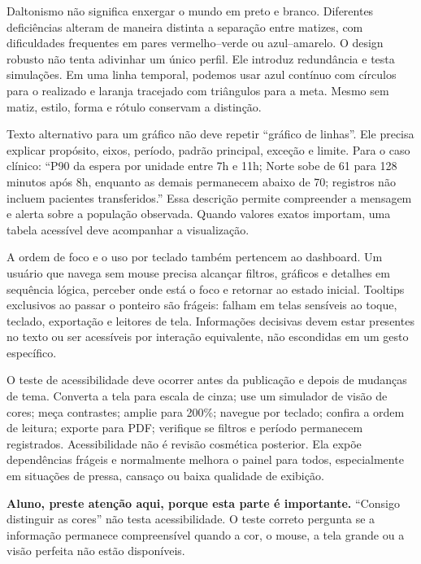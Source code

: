 Daltonismo não significa enxergar o mundo em preto e branco. Diferentes deficiências alteram de maneira distinta a separação entre matizes, com dificuldades frequentes em pares vermelho--verde ou azul--amarelo. O design robusto não tenta adivinhar um único perfil. Ele introduz redundância e testa simulações. Em uma linha temporal, podemos usar azul contínuo com círculos para o realizado e laranja tracejado com triângulos para a meta. Mesmo sem matiz, estilo, forma e rótulo conservam a distinção.

Texto alternativo para um gráfico não deve repetir ``gráfico de linhas''. Ele precisa explicar propósito, eixos, período, padrão principal, exceção e limite. Para o caso clínico: ``P90 da espera por unidade entre 7h e 11h; Norte sobe de 61 para 128 minutos após 8h, enquanto as demais permanecem abaixo de 70; registros não incluem pacientes transferidos.'' Essa descrição permite compreender a mensagem e alerta sobre a população observada. Quando valores exatos importam, uma tabela acessível deve acompanhar a visualização.

A ordem de foco e o uso por teclado também pertencem ao dashboard. Um usuário que navega sem mouse precisa alcançar filtros, gráficos e detalhes em sequência lógica, perceber onde está o foco e retornar ao estado inicial. Tooltips exclusivos ao passar o ponteiro são frágeis: falham em telas sensíveis ao toque, teclado, exportação e leitores de tela. Informações decisivas devem estar presentes no texto ou ser acessíveis por interação equivalente, não escondidas em um gesto específico.

O teste de acessibilidade deve ocorrer antes da publicação e depois de mudanças de tema. Converta a tela para escala de cinza; use um simulador de visão de cores; meça contrastes; amplie para 200\%; navegue por teclado; confira a ordem de leitura; exporte para PDF; verifique se filtros e período permanecem registrados. Acessibilidade não é revisão cosmética posterior. Ela expõe dependências frágeis e normalmente melhora o painel para todos, especialmente em situações de pressa, cansaço ou baixa qualidade de exibição.

\begin{GuidedBox}
\textbf{Aluno, preste atenção aqui, porque esta parte é importante.} ``Consigo distinguir as cores'' não testa acessibilidade. O teste correto pergunta se a informação permanece compreensível quando a cor, o mouse, a tela grande ou a visão perfeita não estão disponíveis.
\end{GuidedBox}

